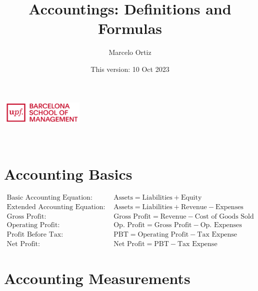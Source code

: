 \documentclass[12pt]{article}
\title{Accountings: Definitions and  Formulas}
\author{Marcelo Ortiz}
\date{This version: 10 Oct 2023}
\begin{document}
\makeatletter  
\begin{center}
	\includegraphics[width=0.3\textwidth]{logo.png}\\[1em]  %
	{\LARGE \textbf{\@title}}\\[1em]  %
	{\large \@author}\\[1em]  %
	{\@date}  %
\end{center}
\makeatother  %

\section{Accounting Basics}
	\begin{tcolorbox}
	\begin{align*}
		\text{Basic Accounting Equation:} \quad & \text{Assets} = \text{Liabilities} + \text{Equity} \\
		\text{Extended Accounting Equation:} \quad & \text{Assets} = \text{Liabilities} + \text{Revenue}- \text{Expenses} \\
		\text{Gross Profit:} \quad & \text{Gross Profit} = \text{Revenue} - \text{Cost of Goods Sold} \\
		\text{Operating Profit:} \quad & \text{Op. Profit} = \text{Gross Profit} - \text{Op. Expenses} \\
		\text{Profit Before Tax:} \quad & \text{PBT} = \text{Operating Profit} - \text{Tax Expense} \\
		\text{Net Profit:} \quad & \text{Net Profit} = \text{PBT} - \text{Tax Expense}
	\end{align*}
	\end{tcolorbox}

\section{Accounting Measurements}
\end{document}
